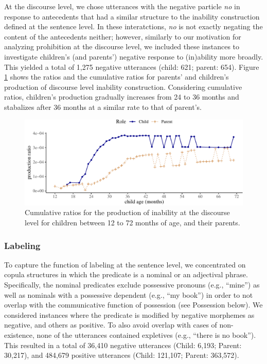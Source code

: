 \documentclass[
  english,
  man,floatsintext]{apa6}
\begin{document}
At the discourse level, we chose utterances with the negative particle \emph{no} in response to antecedents that had a similar structure to the inability construction defined at the sentence level. In these interatctions, \emph{no} is not exactly negating the content of the antecedents neither; however, similarly to our motivation for analyzing prohibition at the discourse level, we included these instances to investigate children's (and parents') negative response to (in)ability more broadly. This yielded a total of 1,275 negative utterances (child: 621; parent: 654). Figure \ref{fig:inabilitydiscourse} shows the ratios and the cumulative ratios for parents' and children's production of discourse level inability construction. Considering cumulative ratios, children's production gradually increases from 24 to 36 months and stabalizes after 36 months at a similar rate to that of parent's.

\begin{figure}[H]

{\centering \includegraphics{neg_construction_article_files/figure-latex/inabilitydiscourse-1} 

}

\caption{Cumulative ratios for the production of inability at the discourse level for children between 12 to 72 months of age, and their parents.}\label{fig:inabilitydiscourse}
\end{figure}

\hypertarget{labeling}{%
\subsubsection{Labeling}\label{labeling}}

To capture the function of labeling at the sentence level, we concentrated on copula structures in which the predicate is a nominal or an adjectival phrase. Specifically, the nominal predicates exclude possessive pronouns (e.g., ``mine'') as well as nominals with a possessive dependent (e.g., ``my book'') in order to not overlap with the communicative function of possession (see Possession below). We considered instances where the predicate is modified by negative morphemes as negative, and others as positive. To also avoid overlap with cases of non-existence, none of the utterances contained expletives (e.g., ``there is no book''). This resulted in a total of 36,410 negative utterances (Child: 6,193; Parent: 30,217), and 484,679 positive utterances (Child: 121,107; Parent: 363,572).
\end{document}
